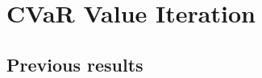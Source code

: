 \documentclass{beamer}
\begin{document}

\section{CVaR Value Iteration}

%
%
%
%
%
%
%
%
%
%


\subsection{Previous results}

%

\end{document}
